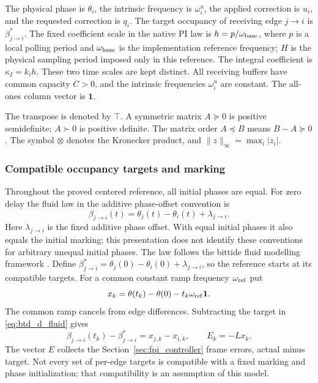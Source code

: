 The physical phase is $\theta_i$, the intrinsic frequency is
$\omega_i^u$, the applied correction is $u_i$, and the requested correction
is $q_i$. The target occupancy of receiving edge $j\to i$ is
$\beta^*_{j\to i}$. The fixed coefficient scale in the native PI law is
$h=p/\omega_{\rm base}$, where $p$ is a local polling period and
$\omega_{\rm base}$ is the implementation reference frequency; $H$ is the
physical sampling period imposed only in this reference. The integral
coefficient is $\kappa_I=k_i h$. These two time scales are kept distinct.
All receiving buffers have common capacity $C>0$, and the intrinsic
frequencies $\omega_i^u$ are constant. The all-ones column vector is $\mathbf1$.

The transpose is denoted by $\top$. A symmetric matrix $A\succeq0$ is
positive semidefinite; $A\succ0$ is positive definite. The matrix order
$A\preceq B$ means $B-A\succeq0$. The symbol $\otimes$ denotes the
Kronecker product, and $\|z\|_\infty=\max_i|z_i|$.

\subsubsection{Compatible occupancy targets and marking}
Throughout the proved centered reference, all initial phases are equal.
For zero delay the fluid law in the additive phase-offset convention is
\begin{equation}
 \beta_{j\to i}(t)=\theta_j(t)-\theta_i(t)+\lambda_{j\to i}.
 \label{eq:btd_d_fluid}
\end{equation}
Here $\lambda_{j\to i}$ is the fixed additive phase offset. With equal
initial phases it also equals the initial marking; this presentation does
not identify these conventions for arbitrary unequal initial phases.
The law follows the bittide fluid modelling framework
\cite{lall2024logicalSynchrony,lall2022resistance}. Define
$\beta^*_{j\to i}=\theta_j(0)-\theta_i(0)+\lambda_{j\to i}$, so the
reference starts at its compatible targets. For a common constant ramp
frequency $\omega_{\rm ref}$ put
\begin{equation}
 x_k=\theta(t_k)-\theta(0)-t_k\omega_{\rm ref}\mathbf1.
 \label{eq:btd_ref_state}
\end{equation}
The common ramp cancels from edge differences. Subtracting the target in
\eqref{eq:btd_d_fluid} gives
\begin{equation}
 \beta_{j\to i}(t_k)-\beta^*_{j\to i}=x_{j,k}-x_{i,k},\qquad E_k=-Lx_k.
 \label{eq:btd_buffer_phase}
\end{equation}
The vector $E$ collects the Section~\ref{sec:fpi_controller} frame errors, actual minus target.
Not every set of per-edge targets is compatible with a fixed marking and
phase initialization; that compatibility is an assumption of this model.

